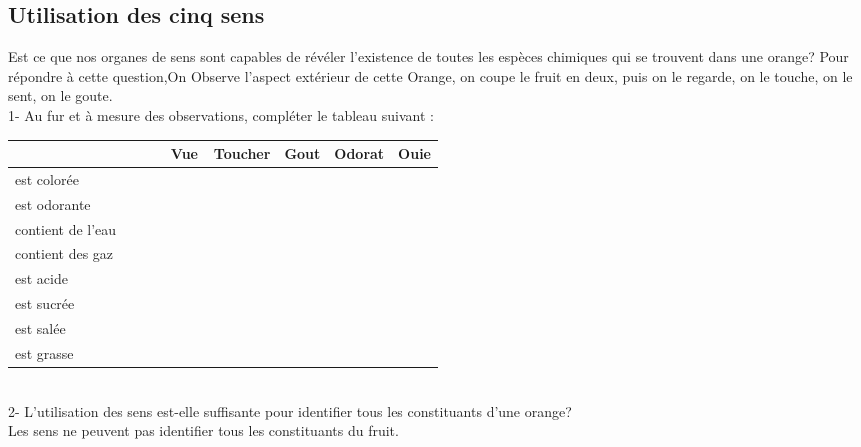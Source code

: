 \documentclass[12pt,a4paper]{book}
\begin{document}
{\subsection{Utilisation des cinq sens}
\noindent
\begin{minipage}{0.70\linewidth}
Est ce que nos organes de sens sont capables de révéler l'existence de toutes les espèces chimiques qui se trouvent dans une orange? Pour répondre à cette question,On Observe l'aspect extérieur de cette Orange, on coupe le fruit en deux, puis on le regarde, on le touche, on le sent, on le goute.\\
1- Au fur et à mesure des observations, compléter le tableau suivant :
\end{minipage}
\begin{minipage}{0.3\linewidth}
  \begin{flushright}
  \end{flushright}
\end{minipage}
\begin{tabularx}{\linewidth}{|X|>{\centering\arraybackslash}p{0.1\linewidth}|>{\centering\arraybackslash}p{0.1\linewidth}|>{\centering\arraybackslash}p{0.1\linewidth}|>{\centering\arraybackslash}p{0.1\linewidth}|>{\centering\arraybackslash}p{0.1\linewidth}|}
\hline 
 & Vue & Toucher & Gout & Odorat & Ouie \\ 
\hline 
est colorée &  &  &  &  &  \\ 
\hline 
est odorante &  &  &  &  &  \\ 
\hline 
contient de l'eau &  &  &  &  &  \\ 
\hline 
contient des gaz &  &  &  &  &  \\ 
\hline 
est acide &  &  &  &  &  \\ 
\hline 
est sucrée &  &  &  &  &  \\ 
\hline 
est salée &  &  &  &  &  \\ 
\hline 
est grasse &  &  &  &  &  \\ 
\hline 
\end{tabularx} \\
2- L'utilisation des sens est-elle suffisante pour identifier tous les constituants d'une orange?
\\Les sens ne peuvent pas identifier tous les constituants du fruit.
}
\end{document}
